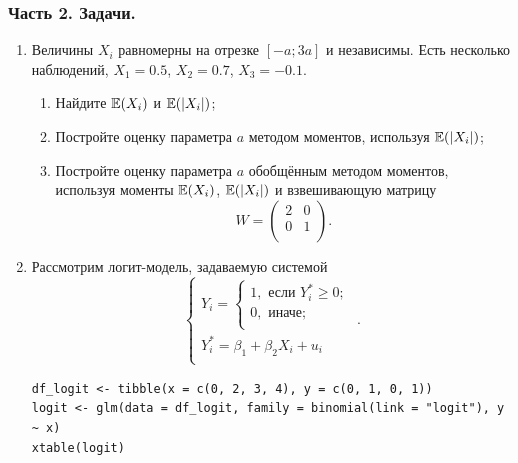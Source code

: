 \documentclass[12pt, a4paper]{article}
\begin{document}





\subsubsection*{Часть 2. Задачи.}


\begin{enumerate}

\item Величины $X_i$ равномерны на отрезке $[-a; 3a]$ и независимы. Есть несколько наблюдений, $X_1=0.5$, $X_2=0.7$, $X_3=-0.1$.

\begin{enumerate}
\item Найдите $\mathbb{E}(X_i)$ и $\mathbb{E}(|X_i|)$;
\item Постройте оценку параметра $a$ методом моментов, используя $\mathbb{E}(|X_i|)$;
\item Постройте оценку параметра $a$ обобщённым методом моментов, используя моменты $\mathbb{E}(X_i)$, $\mathbb{E}(|X_i|)$ и взвешивающую матрицу
\[
W=\begin{pmatrix}
2 & 0 \\
0 & 1 \\
\end{pmatrix}.
\]
\end{enumerate}


\item Рассмотрим логит-модель, задаваемую системой
\[
\begin{cases}
Y_i =
\begin{cases}
1, \text{ если } Y_i^* \geq 0; \\
0, \text{ иначе;} \\
\end{cases} \\
Y_i^* = \beta_1 + \beta_2 X_i + u_i \\
\end{cases}.
\]

\begin{verbatim}
df_logit <- tibble(x = c(0, 2, 3, 4), y = c(0, 1, 0, 1))
logit <- glm(data = df_logit, family = binomial(link = "logit"), y ~ x)
xtable(logit)
\end{verbatim}



\end{enumerate}
\end{document}

